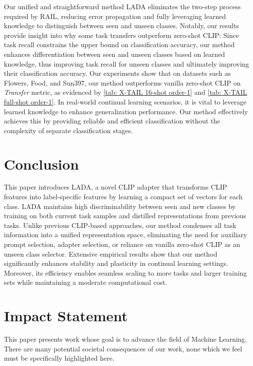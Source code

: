 \documentclass{article}
\theoremstyle{plain}
\theoremstyle{definition}
\theoremstyle{remark}
\begin{document}
Our unified and straightforward method LADA eliminates the two-step process required by RAIL, reducing error propagation and fully leveraging learned knowledge to distinguish between seen and unseen classes. Notably, our results provide insight into why some task transfers outperform zero-shot CLIP: Since task recall constrains the upper bound on classification accuracy, our method enhances differentiation between seen and unseen classes based on learned knowledge, thus improving task recall for unseen classes and ultimately improving their classification accuracy. Our experiments show that on datasets such as Flowers, Food, and Sun397, our method outperforms vanilla zero-shot CLIP on \emph{Transfer} metric, as evidenced by \cref{tab: X-TAIL 16-shot order-1} and \cref{tab: X-TAIL full-shot order-1}. In real-world continual learning scenarios, it is vital to leverage learned knowledge to enhance generalization performance. Our method effectively achieves this by providing reliable and efficient classification without the complexity of separate classification stages.


\section{Conclusion}
This paper introduces LADA, a novel CLIP adapter that transforms CLIP features into label-specific features by learning a compact set of vectors for each class. LADA maintains high discriminability between seen and new classes by training on both current task samples and distilled representations from previous tasks. Unlike previous CLIP-based approaches, our method condenses all task information into a unified representation space, eliminating the need for auxiliary prompt selection, adapter selection, or reliance on vanilla zero-shot CLIP as an unseen class selector. Extensive empirical results show that our method significantly enhances stability and plasticity in continual learning settings. Moreover, its efficiency enables seamless scaling to more tasks and larger training sets while maintaining a moderate computational cost.


\section*{Impact Statement}
This paper presents work whose goal is to advance the field of Machine Learning. There are many potential societal consequences of our work, none which we feel must be specifically highlighted here. 
\end{document}
